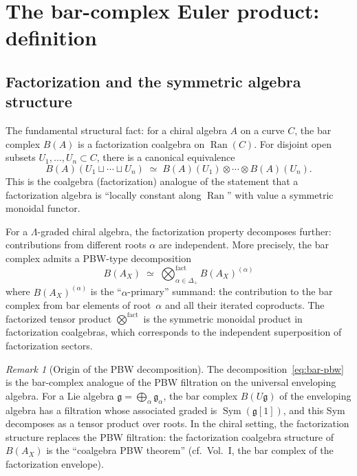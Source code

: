 \documentclass[11pt]{article}
\theoremstyle{definition}
\theoremstyle{remark}
\newtheorem{remark}[theorem]{Remark}
\DeclareMathOperator{\Ran}{Ran}
\DeclareMathOperator{\Sym}{Sym}
\newcommand{\frakg}{\mathfrak{g}}
\begin{document}
\section{The bar-complex Euler product: definition}
\label{sec:bar-euler-def}

\subsection{Factorization and the symmetric algebra structure}

The fundamental structural fact: for a chiral algebra $A$ on a curve $C$, the bar complex $B(A)$ is a factorization coalgebra on $\Ran(C)$. For disjoint open subsets $U_1, \ldots, U_n \subset C$, there is a canonical equivalence
\begin{equation}
\label{eq:factorization}
 B(A)(U_1 \sqcup \cdots \sqcup U_n)
 \;\simeq\;
 B(A)(U_1) \otimes \cdots \otimes B(A)(U_n).
\end{equation}
This is the coalgebra (factorization) analogue of the statement that
a factorization algebra is ``locally constant along $\Ran$'' with
value a symmetric monoidal functor.

For a $\Lambda$-graded chiral algebra, the factorization property
decomposes further: contributions from different roots $\alpha$ are
independent. More precisely, the bar complex admits a PBW-type
decomposition
\begin{equation}
\label{eq:bar-pbw}
 B(A_X) \;\simeq\; \bigotimes_{\alpha \in \Delta_+}^{\text{fact}} B(A_X)^{(\alpha)}
\end{equation}
where $B(A_X)^{(\alpha)}$ is the ``$\alpha$-primary'' summand: the
contribution to the bar complex from bar elements of root~$\alpha$ and
all their iterated coproducts. The factorized tensor product
$\bigotimes^{\text{fact}}$ is the symmetric monoidal product in
factorization coalgebras, which corresponds to the independent superposition
of factorization sectors.

\begin{remark}[Origin of the PBW decomposition]
\label{rem:pbw-origin}
The decomposition~\eqref{eq:bar-pbw} is the bar-complex analogue of
the PBW filtration on the universal enveloping algebra. For a Lie algebra
$\frakg = \bigoplus_\alpha \frakg_\alpha$, the bar complex $B(U\frakg)$ of
the enveloping algebra has a filtration whose associated graded is
$\Sym(\frakg[1])$, and this Sym decomposes as a tensor product over roots.
In the chiral setting, the factorization structure replaces the PBW
filtration: the factorization coalgebra structure of $B(A_X)$ is the
``coalgebra PBW theorem'' (cf.\ Vol.~I, the bar complex of the factorization
envelope).
\end{remark}
\end{document}
